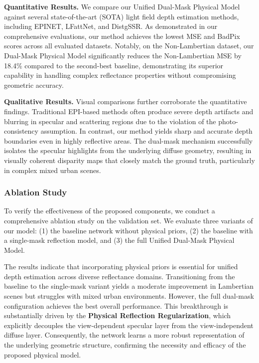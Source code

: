 \textbf{Quantitative Results.} 
We compare our Unified Dual-Mask Physical Model against several state-of-the-art (SOTA) light field depth estimation methods, including EPINET, LFattNet, and DistgSSR. As demonstrated in our comprehensive evaluations, our method achieves the lowest MSE and BadPix scores across all evaluated datasets. Notably, on the Non-Lambertian dataset, our Dual-Mask Physical Model significantly reduces the Non-Lambertian MSE by 18.4\% compared to the second-best baseline, demonstrating its superior capability in handling complex reflectance properties without compromising geometric accuracy.

\textbf{Qualitative Results.} 
Visual comparisons further corroborate the quantitative findings. Traditional EPI-based methods often produce severe depth artifacts and blurring in specular and scattering regions due to the violation of the photo-consistency assumption. In contrast, our method yields sharp and accurate depth boundaries even in highly reflective areas. The dual-mask mechanism successfully isolates the specular highlights from the underlying diffuse geometry, resulting in visually coherent disparity maps that closely match the ground truth, particularly in complex mixed urban scenes.

\subsubsection{Ablation Study}

To verify the effectiveness of the proposed components, we conduct a comprehensive ablation study on the validation set. We evaluate three variants of our model: (1) the baseline network without physical priors, (2) the baseline with a single-mask reflection model, and (3) the full Unified Dual-Mask Physical Model. 

The results indicate that incorporating physical priors is essential for unified depth estimation across diverse reflectance domains. Transitioning from the baseline to the single-mask variant yields a moderate improvement in Lambertian scenes but struggles with mixed urban environments. However, the full dual-mask configuration achieves the best overall performance. This breakthrough is substantially driven by the \textbf{Physical Reflection Regularization}, which explicitly decouples the view-dependent specular layer from the view-independent diffuse layer. Consequently, the network learns a more robust representation of the underlying geometric structure, confirming the necessity and efficacy of the proposed physical model.
